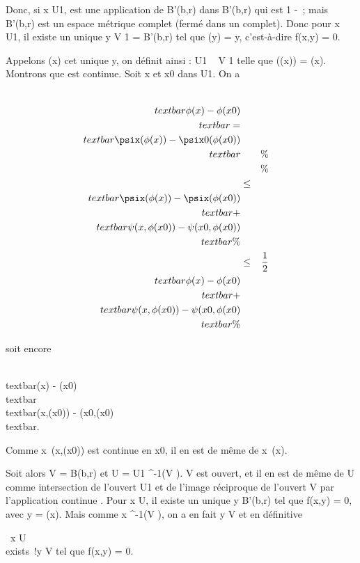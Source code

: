 Donc, si x \in U1, \psix est une application de B'(b,r)
dans B'(b,r) qui est  1 
-\textcontractante~; mais B'(b,r) est un espace
métrique complet (fermé dans un complet). Donc pour x \in U1, il
existe un unique y \in V 1 = B'(b,r) tel que \psix(y) =
y, c'est-à-dire f(x,y) = 0.

Appelons \phi(x) cet unique y, on définit ainsi \phi : U1 \rightarrow~ V
1 telle que \psix(\phi(x)) = \phi(x). Montrons que \phi est
continue. Soit x et x0 dans U1. On a

\begin{align*} \\textbar{}\phi(x) -
\phi(x0)\\textbar{} =\\textbar{}
\psix(\phi(x)) -
\psix0(\phi(x0))\\textbar{}&&
\%& \\ & & \%&
\\ & \leq&
\\textbar{}\psix(\phi(x)) -
\psix(\phi(x0))\\textbar{}
+\\textbar{} \psi(x,\phi(x0)) -
\psi(x0,\phi(x0))\\textbar{}\%&
\\ & \leq& 1 \over 2
\\textbar{}\phi(x) -
\phi(x0)\\textbar{} +\\textbar{}
\psi(x,\phi(x0)) -
\psi(x0,\phi(x0)\\textbar{} \%&
\\ \end{align*}

soit encore

\\textbar{}\phi(x) -
\phi(x0)\\textbar{} \\textbar{}\psi(x,\phi(x0)) -
\psi(x0,\phi(x0)\\textbar{}.

Comme x\mapsto~\psi(x,\phi(x0)) est continue en
x0, il en est de même de x\mapsto~\phi(x).

Soit alors V = B(b,r) et U = U1 \bigcap \phi^-1(V ). V est
ouvert, et il en est de même de U comme intersection de l'ouvert
U1 et de l'image réciproque de l'ouvert V par l'application
continue \phi. Pour x \in U, il existe un unique y \in B'(b,r) tel que f(x,y) =
0, avec y = \phi(x). Mais comme x \in \phi^-1(V ), on a en fait y \in V
et en définitive

\forall~x \in U \\exists~!y \in V
\text tel que f(x,y) = 0.

